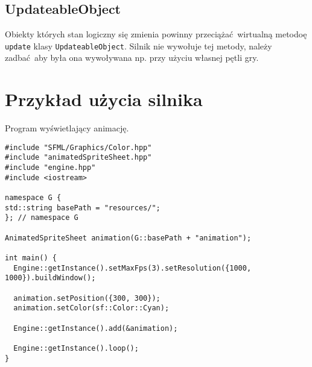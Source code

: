 \documentclass[11pt]{article}
\begin{document}
\subsection{UpdateableObject}
\label{sec:org2df8fac}
Obiekty których stan logiczny się zmienia powinny przeciążać wirtualną metodoę \texttt{update} klasy \texttt{UpdateableObject}.
Silnik nie wywołuje tej metody, należy zadbać aby była ona wywoływana np. przy użyciu własnej pętli gry.
\section{Przykład użycia silnika}
\label{sec:orgb867cad}
Program wyświetlający animację.

\begin{verbatim}
#include "SFML/Graphics/Color.hpp"
#include "animatedSpriteSheet.hpp"
#include "engine.hpp"
#include <iostream>

namespace G {
std::string basePath = "resources/";
}; // namespace G

AnimatedSpriteSheet animation(G::basePath + "animation");

int main() {
  Engine::getInstance().setMaxFps(3).setResolution({1000, 1000}).buildWindow();

  animation.setPosition({300, 300});
  animation.setColor(sf::Color::Cyan);

  Engine::getInstance().add(&animation);

  Engine::getInstance().loop();
}
\end{verbatim}
\end{document}
